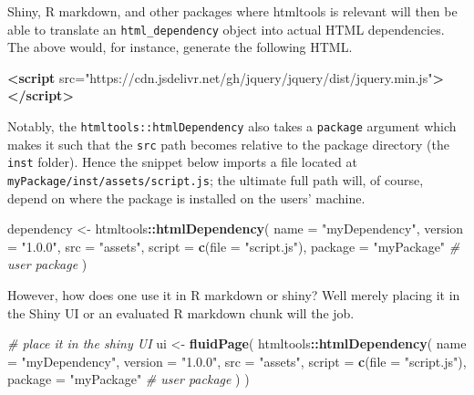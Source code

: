 \documentclass[
]{krantz}
\makeatletter
\newenvironment{Shaded}{\begin{snugshade}}{\end{snugshade}}
\newcommand{\CommentTok}[1]{\textcolor[rgb]{0.37,0.37,0.37}{\textit{#1}}}
\newcommand{\DataTypeTok}[1]{\textcolor[rgb]{0.27,0.27,0.27}{#1}}
\newcommand{\KeywordTok}[1]{\textcolor[rgb]{0.27,0.27,0.27}{\textbf{#1}}}
\newcommand{\NormalTok}[1]{#1}
\newcommand{\OperatorTok}[1]{\textcolor[rgb]{0.43,0.43,0.43}{\textbf{#1}}}
\newcommand{\OtherTok}[1]{\textcolor[rgb]{0.37,0.37,0.37}{#1}}
\newcommand{\StringTok}[1]{\textcolor[rgb]{0.5,0.5,0.5}{#1}}
\newenvironment{kframe}{%
\medskip{}
\setlength{\fboxsep}{.8em}
 \def\at@end@of@kframe{}%
 \ifinner\ifhmode%
  \def\at@end@of@kframe{\end{minipage}}%
  \begin{minipage}{\columnwidth}%
 \fi\fi%
 \def\FrameCommand##1{\hskip\@totalleftmargin \hskip-\fboxsep
 \colorbox{shadecolor}{##1}\hskip-\fboxsep
     \hskip-\linewidth \hskip-\@totalleftmargin \hskip\columnwidth}%
 \MakeFramed {\advance\hsize-\width
   \@totalleftmargin\z@ \linewidth\hsize
   \@setminipage}}%
 {\par\unskip\endMakeFramed%
 \at@end@of@kframe}
\renewenvironment{Shaded}{\begin{kframe}}{\end{kframe}}
\makeatother
\begin{document}
Shiny, R markdown, and other packages where htmltools is relevant will then be able to translate an \texttt{html\_dependency} object into actual HTML dependencies. The above would, for instance, generate the following HTML.

\begin{Shaded}
\begin{Highlighting}[]
\KeywordTok{<script}\OtherTok{ src=}\StringTok{"https://cdn.jsdelivr.net/gh/jquery/jquery/dist/jquery.min.js"}\KeywordTok{></script>}
\end{Highlighting}
\end{Shaded}

Notably, the \texttt{htmltools::htmlDependency} also takes a \texttt{package} argument which makes it such that the \texttt{src} path becomes relative to the package directory (the \texttt{inst} folder). Hence the snippet below imports a file located at \texttt{myPackage/inst/assets/script.js}; the ultimate full path will, of course, depend on where the package is installed on the users' machine.

\begin{Shaded}
\begin{Highlighting}[]
\NormalTok{dependency <{-}}\StringTok{ }\NormalTok{htmltools}\OperatorTok{::}\KeywordTok{htmlDependency}\NormalTok{(}
  \DataTypeTok{name =} \StringTok{"myDependency"}\NormalTok{,}
  \DataTypeTok{version =} \StringTok{"1.0.0"}\NormalTok{,}
  \DataTypeTok{src =} \StringTok{"assets"}\NormalTok{,}
  \DataTypeTok{script =} \KeywordTok{c}\NormalTok{(}\DataTypeTok{file =} \StringTok{"script.js"}\NormalTok{),}
  \DataTypeTok{package =} \StringTok{"myPackage"} \CommentTok{\# user package}
\NormalTok{)}
\end{Highlighting}
\end{Shaded}

However, how does one use it in R markdown or shiny? Well merely placing it in the Shiny UI or an evaluated R markdown chunk will the job.

\begin{Shaded}
\begin{Highlighting}[]
\CommentTok{\# place it in the shiny UI}
\NormalTok{ui <{-}}\StringTok{ }\KeywordTok{fluidPage}\NormalTok{(}
\NormalTok{  htmltools}\OperatorTok{::}\KeywordTok{htmlDependency}\NormalTok{(}
    \DataTypeTok{name =} \StringTok{"myDependency"}\NormalTok{,}
    \DataTypeTok{version =} \StringTok{"1.0.0"}\NormalTok{,}
    \DataTypeTok{src =} \StringTok{"assets"}\NormalTok{,}
    \DataTypeTok{script =} \KeywordTok{c}\NormalTok{(}\DataTypeTok{file =} \StringTok{"script.js"}\NormalTok{),}
    \DataTypeTok{package =} \StringTok{"myPackage"} \CommentTok{\# user package}
\NormalTok{  )}
\NormalTok{)}
\end{Highlighting}
\end{Shaded}
\end{document}
